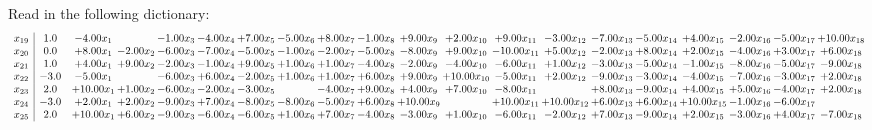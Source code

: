 \documentclass[9pt]{article}
\begin{document}
Read in the following dictionary:
\[\begin{array}{c| c c@{\hskip 2pt} c@{\hskip 2pt} c@{\hskip 2pt} c@{\hskip 2pt} c@{\hskip 2pt} c@{\hskip 2pt} c@{\hskip 2pt} c@{\hskip 2pt} c@{\hskip 2pt} c@{\hskip 2pt} c@{\hskip 2pt} c@{\hskip 2pt} c@{\hskip 2pt} c@{\hskip 2pt} c@{\hskip 2pt} c@{\hskip 2pt} c@{\hskip 2pt} c@{\hskip 2pt} }
 x_{19}   &  1.0 & -4.00 x_{1} &   & -1.00 x_{3} & -4.00 x_{4} & +  7.00 x_{5} & -5.00 x_{6} & +  8.00 x_{7} & -1.00 x_{8} & +  9.00 x_{9} & +  2.00 x_{10} & +  9.00 x_{11} & -3.00 x_{12} & -7.00 x_{13} & -5.00 x_{14} & +  4.00 x_{15} & -2.00 x_{16} & -5.00 x_{17} & + 10.00 x_{18}\\
 x_{20}   &  0.0 & +  8.00 x_{1} & -2.00 x_{2} & -6.00 x_{3} & -7.00 x_{4} & -5.00 x_{5} & -1.00 x_{6} & -2.00 x_{7} & -5.00 x_{8} & -8.00 x_{9} & +  9.00 x_{10} & -10.00 x_{11} & +  5.00 x_{12} & -2.00 x_{13} & +  8.00 x_{14} & +  2.00 x_{15} & -4.00 x_{16} & +  3.00 x_{17} & +  6.00 x_{18}\\
 x_{21}   &  1.0 & +  4.00 x_{1} & +  9.00 x_{2} & -2.00 x_{3} & -1.00 x_{4} & +  9.00 x_{5} & +  1.00 x_{6} & +  1.00 x_{7} & -4.00 x_{8} & -2.00 x_{9} & -4.00 x_{10} & -6.00 x_{11} & +  1.00 x_{12} & -3.00 x_{13} & -5.00 x_{14} & -1.00 x_{15} & -8.00 x_{16} & -5.00 x_{17} & -9.00 x_{18}\\
 x_{22}   &  -3.0 & -5.00 x_{1} &   & -6.00 x_{3} & +  6.00 x_{4} & -2.00 x_{5} & +  1.00 x_{6} & +  1.00 x_{7} & +  6.00 x_{8} & +  9.00 x_{9} & + 10.00 x_{10} & -5.00 x_{11} & +  2.00 x_{12} & -9.00 x_{13} & -3.00 x_{14} & -4.00 x_{15} & -7.00 x_{16} & -3.00 x_{17} & +  2.00 x_{18}\\
 x_{23}   &  2.0 & + 10.00 x_{1} & +  1.00 x_{2} & -6.00 x_{3} & -2.00 x_{4} & -3.00 x_{5} &   & -4.00 x_{7} & +  9.00 x_{8} & +  4.00 x_{9} & +  7.00 x_{10} & -8.00 x_{11} &   & +  8.00 x_{13} & -9.00 x_{14} & +  4.00 x_{15} & +  5.00 x_{16} & -4.00 x_{17} & +  2.00 x_{18}\\
 x_{24}   &  -3.0 & +  2.00 x_{1} & +  2.00 x_{2} & -9.00 x_{3} & +  7.00 x_{4} & -8.00 x_{5} & -8.00 x_{6} & -5.00 x_{7} & +  6.00 x_{8} & + 10.00 x_{9} &   & + 10.00 x_{11} & + 10.00 x_{12} & +  6.00 x_{13} & +  6.00 x_{14} & + 10.00 x_{15} & -1.00 x_{16} & -6.00 x_{17} &   \\
 x_{25}   &  2.0 & + 10.00 x_{1} & +  6.00 x_{2} & -9.00 x_{3} & -6.00 x_{4} & -6.00 x_{5} & +  1.00 x_{6} & +  7.00 x_{7} & -4.00 x_{8} & -3.00 x_{9} & +  1.00 x_{10} & -6.00 x_{11} & -2.00 x_{12} & +  7.00 x_{13} & -9.00 x_{14} & +  2.00 x_{15} & -3.00 x_{16} & +  4.00 x_{17} & -7.00 x_{18}\\

\end{array}\]
\end{document}

